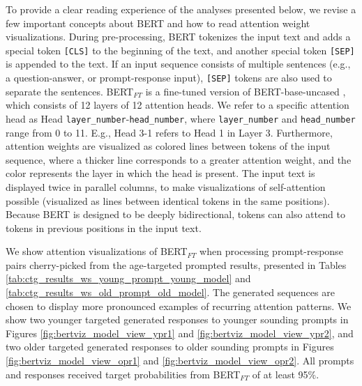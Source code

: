 To provide a clear reading experience of the analyses presented below, we revise a few important concepts about BERT and how to read attention weight visualizations. During pre-processing, BERT tokenizes the input text and adds a special token \texttt{[CLS]} to the beginning of the text, and another special token \texttt{[SEP]} is appended to the text. If an input sequence consists of multiple sentences (e.g., a question-answer, or prompt-response input), \texttt{[SEP]} tokens are also used to separate the sentences. BERT$_{FT}$ is a fine-tuned version of BERT-base-uncased \citep{devlin-etal-2019-bert}, which consists of 12 layers of 12 attention heads. We refer to a specific attention head as Head \texttt{layer\_number}-\texttt{head\_number}, where \texttt{layer\_number} and \texttt{head\_number} range from 0 to 11. E.g., Head 3-1 refers to Head 1 in Layer 3. Furthermore, attention weights are visualized as colored lines between tokens of the input sequence, where a thicker line corresponds to a greater attention weight, and the color represents the layer in which the head is present. The input text is displayed twice in parallel columns, to make visualizations of self-attention possible (visualized as lines between identical tokens in the same positions). Because BERT is designed to be deeply bidirectional, tokens can also attend to tokens in previous positions in the input text.

We show attention visualizations of BERT$_{FT}$ when processing prompt-response pairs cherry-picked from the age-targeted prompted results, presented in Tables \ref{tab:ctg_results_ws_young_prompt_young_model} and \ref{tab:ctg_results_ws_old_prompt_old_model}. The generated sequences are chosen to display more pronounced examples of recurring attention patterns. We show two younger targeted generated responses to younger sounding prompts in Figures \ref{fig:bertviz_model_view_ypr1} and \ref{fig:bertviz_model_view_ypr2}, and two older targeted generated responses to older sounding prompts in Figures \ref{fig:bertviz_model_view_opr1} and \ref{fig:bertviz_model_view_opr2}. All prompts and responses received target probabilities from BERT$_{FT}$ of at least 95\%.

